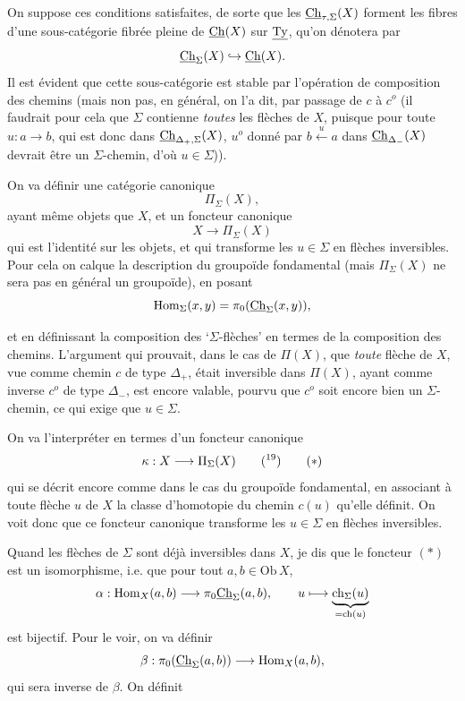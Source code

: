 On suppose ces conditions satisfaites, de sorte que les $\underline{\mathrm{Ch}}_{\tau,\Sigma}(X)$ forment les fibres d'une sous-catégorie fibrée pleine de $\underline{\mathrm{Ch}}(X)$ sur $\underline{\mathrm{Ty}}$, qu'on dénotera par
\[
\underline{\mathrm{Ch}}_{\Sigma}(X) \hookrightarrow \underline{\mathrm{Ch}}(X).
\]
Il est évident que cette sous-catégorie est stable par l'opération de composition des chemins (mais non pas, en général, on l'a dit, par passage de $c$ à $c^o$ (il faudrait pour cela que $\Sigma$ contienne \textit{toutes} les flèches de $X$, puisque pour toute $u : a \longrightarrow b$, qui est donc dans $\underline{\mathrm{Ch}}_{\Delta_+,\Sigma}(X)$, $u^o$ donné par $b \xleftarrow{\ u\ } a$ dans $\underline{\mathrm{Ch}}_{\Delta_-}(X)$ devrait être un $\Sigma$-chemin, d'où $u \in \Sigma$)).

On va définir une catégorie canonique
\[
\Pi_\Sigma(X),
\]
ayant même objets que $X$, et un foncteur canonique
\[
X \longrightarrow \Pi_\Sigma(X)
\]
qui est l'identité sur les objets, et qui transforme les $u \in \Sigma$ en flèches inversibles. Pour cela on calque la description du groupoïde fondamental (mais $\Pi_\Sigma(X)$ ne sera pas en général un groupoïde), en posant
\[
\mathrm{Hom}_\Sigma(x,y) = \pi_0(\underline{\mathrm{Ch}}_\Sigma(x,y)),
\]


et en définissant la composition des `$\Sigma$-flèches' en termes de la composition des chemins. L'argument qui prouvait, dans le cas de $\Pi(X)$, que \textit{toute} flèche de $X$, vue comme chemin $c$ de type $\Delta_+$, était inversible dans $\Pi(X)$, ayant comme inverse $c^o$ de type $\Delta_-$, est encore valable, pourvu que $c^o$ soit encore bien un $\Sigma$-chemin, ce qui exige que $u \in \Sigma$.

On va l'interpréter en termes d'un foncteur canonique
\[
\kappa : X \longrightarrow \Pi_\Sigma(X) \qquad \text{(\footnotemark[19])}
\tag*{$(*)$}
\]
qui se décrit encore comme dans le cas du groupoïde fondamental, en associant à toute flèche $u$ de $X$ la classe d'homotopie du chemin $c(u)$ qu'elle définit. On voit donc que ce foncteur canonique transforme les $u \in \Sigma$ en flèches inversibles.

Quand les flèches de $\Sigma$ sont déjà inversibles dans $X$, je dis que le foncteur $(*)$ est un isomorphisme, i.e. que pour tout $a, b \in \mathrm{Ob}\,X$,
\[
\alpha : \mathrm{Hom}_X(a,b) \longrightarrow \pi_0\underline{\mathrm{Ch}}_\Sigma(a,b), \qquad u \longmapsto \underbrace{\mathrm{ch}_\Sigma(u)}_{= \mathrm{ch}(u)}
\]
est bijectif. Pour le voir, on va définir
\[
\beta : \pi_0(\underline{\mathrm{Ch}}_\Sigma(a,b)) \longrightarrow \mathrm{Hom}_X(a,b),
\]
qui sera inverse de $\beta$. On définit %

